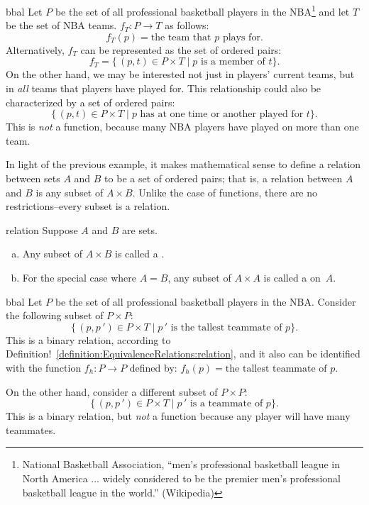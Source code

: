 \begin{example}{bbal}
Let $P$ be the set of all professional basketball players in the NBA\footnote{National Basketball Association, ``men's professional basketball league in North America $\ldots$ widely considered to be the premier men's professional basketball league in the world.'' (Wikipedia)}  and let $T$ be the set of NBA teams.  $f_T: P \to T$ as follows:
$$f_T(p)=\text{the team that }p \text{ plays for}.$$
Alternatively, $f_T$ can be represented as the set of ordered pairs:
\[ f_T=\{\, (p,t)  \in  P \times T  \mid  p  \text{  is a member of } t\} .\]
On the other hand, we may be interested not just in  players' current teams, but in \emph{all} teams that players have played for.  This relationship could also be characterized by a set of ordered pairs: 
\[ \{\, (p,t)  \in  P \times T  \mid  p  \text{  has at one time or another played for } t\} .\]
This is \emph{not} a function, because many NBA players have played on more than one team.
\end{example}

In light of the previous example, it makes mathematical sense to  define a relation between sets $A$ and $B$ to be a set of ordered pairs; that is, a relation between $A$ and $B$  is any subset of $A \times B$. Unlike the case of functions, there are no restrictions--every subset is a relation.


\begin{defn}{relation}  Suppose $A$ and $B$ are sets. 
\begin{enumerate}[(a)]
\item Any subset of $A \times B$ is called a .
\item For the special case where $A = B$, any subset of $A \times A$ is called a   on~$A$.
\end{enumerate}
\end{defn}

\begin{example}{bbal}
Let $P$ be the set of all professional basketball players in the NBA. 
Consider the following subset of $P \times P$:
\[ \{\, (p,p\,')  \in  P \times T  \mid  p\,'  \text{  is the tallest teammate of } p\} .\]
This is a binary relation, according to Definition!~\ref{definition:EquivalenceRelations:relation}, and it also can be identified with the function
 $f_h: P \to P$ defined by: $f_h(p)=\text{the tallest teammate of }p .$

On the other hand, consider a different subset of $P \times P$:
\[ \{\, (p,p\,')  \in  P \times T  \mid  p\,'  \text{  is a teammate of } p\} .\]
 This is a binary relation, but \emph{not} a function because any player will have many teammates.
\end{example}

